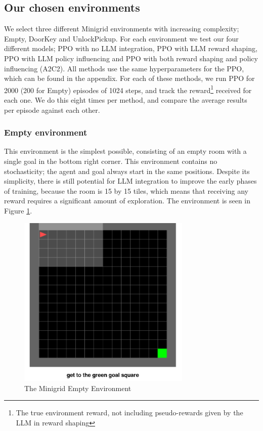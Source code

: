 \documentclass[conference]{IEEEtran}
\begin{document}
\subsection{Our chosen environments}

We select three different Minigrid environments with increasing complexity; Empty, DoorKey and UnlockPickup. For each environment we test our four different models; PPO with no LLM integration, PPO with LLM reward shaping, PPO with LLM policy influencing and PPO with both reward shaping and policy influencing (A2C2). All methods use the same hyperparameters for the PPO, which can be found in the appendix. For each of these methods, we run PPO for 2000 (200 for Empty) episodes of 1024 steps, and track the reward\footnote{The true environment reward, not including pseudo-rewards given by the LLM in reward shaping} received for each one. We do this eight times per method, and compare the average results per episode against each other.

\subsubsection{Empty environment}

This environment is the simplest possible, consisting of an empty room with a single goal in the bottom right corner. This environment contains no stochasticity; the agent and goal always start in the same positions. Despite its simplicity, there is still potential for LLM integration to improve the early phases of training, because the room is 15 by 15 tiles, which means that receiving any reward requires a significant amount of exploration. The environment is seen in Figure \ref{emptyenv}.

\begin{figure}[h]
\centerline{\includegraphics[width=3.25in]{figure/emptyenv.png}}
\caption{The Minigrid Empty Environment}
\label{emptyenv}
\end{figure}
\end{document}
